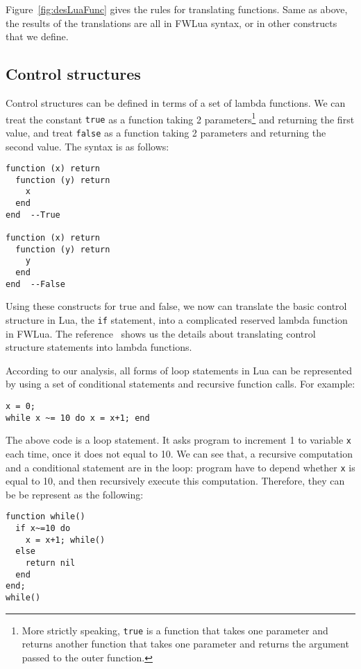 Figure~\ref{fig:desLuaFunc} gives the rules for translating functions. Same as above, the results of the translations are all in FWLua syntax, or in other constructs that we define.

\subsection{Control structures}
Control structures can be defined in terms of a set of lambda functions. 
We can treat the constant {\tt true} as a function taking 2 parameters\footnote{
  More strictly speaking, {\tt true} is a function that takes one parameter
  and returns another function that takes one parameter and returns
  the argument passed to the outer function.
}
and returning the first value, and treat {\tt false} as a function taking 2 parameters and returning the second value. The syntax is as follows:

\begin{verbatim}
function (x) return 
  function (y) return 
    x
  end
end  --True

function (x) return 
  function (y) return 
    y
  end
end  --False
\end{verbatim}

Using these constructs for true and false, we now can translate the basic control structure in Lua, the {\tt if} statement, into a complicated reserved lambda function in FWLua. The reference~\cite{TAPL} shows us the details about translating control structure statements into lambda functions.

According to our analysis, all forms of loop statements in Lua can be represented by using a set of conditional statements and recursive function calls. For example:

\begin{verbatim}
x = 0;
while x ~= 10 do x = x+1; end
\end{verbatim}

The above code is a loop statement. It asks program to increment 1 to variable {\tt x} each time, once it does not equal to 10. We can see that, a recursive computation and a conditional statement are in the loop: program have to depend whether {\tt x} is equal to 10, and then recursively execute this computation. Therefore, they can be be represent as the following:

\begin{verbatim}
function while()
  if x~=10 do
    x = x+1; while()
  else
    return nil
  end
end;
while()
\end{verbatim}

